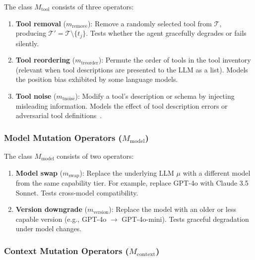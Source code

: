 \begin{definition}
\label{def:tool-mutations}
The class $M_{\text{tool}}$ consists of three operators:
\begin{enumerate}[leftmargin=*]
  \item \textbf{Tool removal} ($m_{\text{remove}}$): Remove a randomly
    selected tool from $\mathcal{T}$, producing
    $\mathcal{T}' = \mathcal{T} \setminus \{t_j\}$. Tests whether the
    agent gracefully degrades or fails silently.

  \item \textbf{Tool reordering} ($m_{\text{treorder}}$): Permute the
    order of tools in the tool inventory (relevant when tool descriptions
    are presented to the LLM as a list). Models the position bias
    exhibited by some language models.

  \item \textbf{Tool noise} ($m_{\text{tnoise}}$): Modify a tool's
    description or schema by injecting misleading information. Models
    the effect of tool description errors or adversarial tool
    definitions~\citep{clawhavoc2026}.
\end{enumerate}
\end{definition}

\subsubsection{Model Mutation Operators ($M_{\text{model}}$)}
\label{sec:mutation:model}

\begin{definition}
\label{def:model-mutations}
The class $M_{\text{model}}$ consists of two operators:
\begin{enumerate}[leftmargin=*]
  \item \textbf{Model swap} ($m_{\text{swap}}$): Replace the underlying
    LLM $\mu$ with a different model from the same capability tier.
    For example, replace GPT-4o with Claude 3.5 Sonnet. Tests
    cross-model compatibility.

  \item \textbf{Version downgrade} ($m_{\text{version}}$): Replace the
    model with an older or less capable version (e.g., GPT-4o $\to$
    GPT-4o-mini). Tests graceful degradation under model changes.
\end{enumerate}
\end{definition}

\subsubsection{Context Mutation Operators ($M_{\text{context}}$)}
\label{sec:mutation:context}

